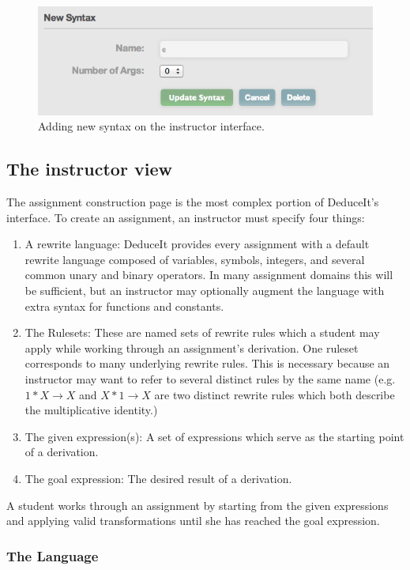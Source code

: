 \documentclass{sigchi}
\begin{document}
\begin{figure}[!h]
\centering
\includegraphics[width=1\columnwidth]{syntax}
\caption{Adding new syntax on the instructor interface.}
\label{fig:syntax}
\end{figure}

\subsection{The instructor view}

The assignment construction page is the most complex portion of DeduceIt's interface. To create an assignment, an instructor must specify four things: 
  \begin{enumerate}
  \item A rewrite language: DeduceIt provides every assignment with a default rewrite language composed of variables, symbols, integers, and several common unary and binary operators. In many assignment domains this will be sufficient, but an instructor may optionally augment the language with extra syntax for functions and constants. 
  \item The Rulesets: These are named sets of rewrite rules which a student may apply while working through an assignment's derivation. One ruleset corresponds to many underlying rewrite rules. This is necessary because an instructor may want to refer to several distinct rules by the same name (e.g. $1*X \rightarrow X$ and $X*1 \rightarrow X$ are two distinct rewrite rules which both describe the multiplicative identity.)
  \item The given expression(s): A set of expressions which serve as the starting point of a derivation.
  \item The goal expression: The desired result of a derivation.
  \end{enumerate}

A student works through an assignment by starting from the given expressions and applying valid transformations until she has reached the goal expression.

\subsubsection{The Language}
\end{document}
